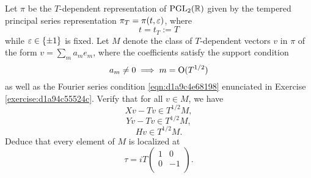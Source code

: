 \documentclass[reqno]{amsart} 
\numberwithin{equation}{section}
\begin{document}
\begin{exercise}\label{exercise:d1aa01c53f48}
  Let $\pi$ be the $T$-dependent representation of $\operatorname{PGL}_2(\mathbb{R})$ given by the tempered principal series representation $\pi_T = \pi(t,\varepsilon)$, where
  \begin{equation*}
    t = t_T := T
  \end{equation*}
  while $\varepsilon \in \{\pm 1\}$ is fixed.  Let $M$ denote the class of $T$-dependent vectors $v$ in $\pi$ of the form $v = \sum_m a_m e_m$, where the coefficients satisfy the support condition
  \begin{equation*}
    a_m \neq 0 \implies m = \operatorname{O}(T^{1/2})
  \end{equation*}
  as well as the Fourier series condition \eqref{eqn:d1a9c4e68198} enunciated in Exercise \ref{exercise:d1a94c55524c}.  Verify that for all $v \in M$, we have
  \begin{equation*}
    X v - T v \in T^{1/2} M,
  \end{equation*}
  \begin{equation*}
    Y v - T v \in T^{1/2}  M,
  \end{equation*}
  \begin{equation*}
    H v \in T^{1/2} M.
  \end{equation*}
  Deduce that every element of $M$ is localized at
  \begin{equation*}
    \tau = i T
    \begin{pmatrix}
      1 &  0 \\
      0 & -1 \\
    \end{pmatrix}.
  \end{equation*}
\end{exercise}
\end{document}
